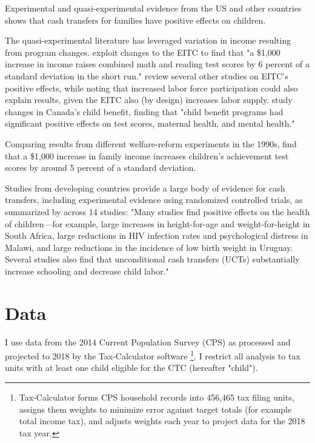 \documentclass[12pt]{article}
\begin{document}
Experimental and quasi-experimental evidence from the US and other countries shows that cash transfers for families have positive effects on children. 

The quasi-experimental literature has leveraged variation in income resulting from program changes.  exploit changes to the EITC to find that "a \$1,000 increase in income raises combined math and reading test scores by 6 percent of a standard deviation in the short run."  review several other studies on EITC's positive effects, while noting that increased labor force participation could also explain results, given the EITC also (by design) increases labor supply.  study changes in Canada's child benefit, finding that "child benefit programs had significant positive effects on test scores, maternal health, and mental health." 

Comparing results from different welfare-reform experiments in the 1990s,  find that a \$1,000 increase in family income increases children's achievement test scores by around 5 percent of a standard deviation.

Studies from developing countries provide a large body of evidence for cash transfers, including experimental evidence using randomized controlled trials, as summarized by  across 14 studies: "Many studies find positive effects on the health of children—for example, large increases in height-for-age and weight-for-height in South Africa, large reductions in HIV infection rates and psychological distress in Malawi, and large reductions in the incidence of low birth weight in Uruguay. Several studies also find that unconditional cash transfers (UCTs) substantially increase schooling and decrease child labor."

\section{Data} \label{sec:data}

I use data from the 2014 Current Population Survey (CPS) as processed and projected to 2018 by the Tax-Calculator software \cite{using_taxcalc}\footnote{Tax-Calculator forms CPS household records into 456,465 tax filing units, assigns them weights to minimize error against target totals (for example total income tax), and adjusts weights each year to project data for the 2018 tax year.}. I restrict all analysis to tax units with at least one child eligible for the CTC (hereafter "child").
\end{document}
